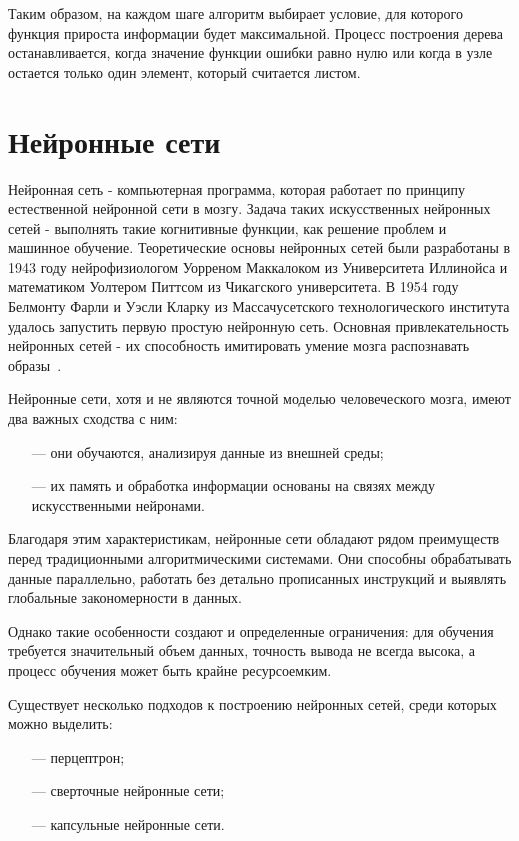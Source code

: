 Таким образом, на каждом шаге алгоритм выбирает условие, для которого функция прироста информации будет максимальной. Процесс построения дерева останавливается, когда значение функции ошибки равно нулю или когда в узле остается только один элемент, который считается листом.

\section{Нейронные сети}

Нейронная сеть - компьютерная программа, которая работает по принципу естественной нейронной сети в мозгу. Задача таких искусственных нейронных сетей - выполнять такие когнитивные функции, как решение проблем и машинное обучение. Теоретические основы нейронных сетей были разработаны в 1943 году нейрофизиологом Уорреном Маккалоком из Университета Иллинойса и математиком Уолтером Питтсом из Чикагского университета. В 1954 году Белмонту Фарли и Уэсли Кларку из Массачусетского технологического института удалось запустить первую простую нейронную сеть. Основная привлекательность нейронных сетей - их способность имитировать умение мозга распознавать образы~\cite{neural_network}.

Нейронные сети, хотя и не являются точной моделью человеческого мозга, имеют два важных сходства с ним:

\begin{itemize}
    \item[---] они обучаются, анализируя данные из внешней среды;
    \item[---] их память и обработка информации основаны на связях между искусственными нейронами.
\end{itemize}

Благодаря этим характеристикам, нейронные сети обладают рядом преимуществ перед традиционными алгоритмическими системами. Они способны обрабатывать данные параллельно, работать без детально прописанных инструкций и выявлять глобальные закономерности в данных.

Однако такие особенности создают и определенные ограничения: для обучения требуется значительный объем данных, точность вывода не всегда высока, а процесс обучения может быть крайне ресурсоемким.

Существует несколько подходов к построению нейронных сетей, среди которых можно выделить:

\begin{itemize}
    \item[---] перцептрон;
    \item[---] сверточные нейронные сети;
    \item[---] капсульные нейронные сети.
\end{itemize}


